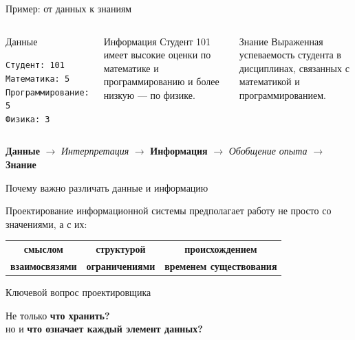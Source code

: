 \documentclass[aspectratio=169]{beamer}
\begin{document}
\begin{frame}{Пример: от данных к знаниям}

\begin{columns}[T]
\begin{block}{\centering Данные}
\begin{center}
\small
\texttt{Студент: 101}\\[0.1cm]
\texttt{Математика: 5}\\[0.1cm]
\texttt{Программирование: 5}\\[0.1cm]
\texttt{Физика: 3}
\end{center}
\end{block}

\begin{block}{\centering Информация}
\small
Студент 101 имеет высокие оценки по математике и программированию и более низкую — по физике.
\end{block}

\begin{block}{\centering Знание}
\small
Выраженная успеваемость студента в дисциплинах, связанных с математикой и программированием.
\end{block}
\end{columns}

\vspace{0.7cm}

\begin{center}
\large
\textbf{Данные}
\;$\longrightarrow$\;
\textit{Интерпретация}
\;$\longrightarrow$\;
\textbf{Информация}
\;$\longrightarrow$\;
\textit{Обобщение опыта}
\;$\longrightarrow$\;
\textbf{Знание}
\end{center}

\end{frame}


\begin{frame}{Почему важно различать данные и информацию}

Проектирование информационной системы предполагает  
работу не просто со значениями, а с их:

\vspace{0.4cm}

\begin{center}
\begin{tabular}{ccc}
\textbf{смыслом} & \textbf{структурой} & \textbf{происхождением} \\[0.3cm]
\textbf{взаимосвязями} & \textbf{ограничениями} & \textbf{временем существования}
\end{tabular}
\end{center}

\vspace{0.7cm}

\begin{alertblock}{Ключевой вопрос проектировщика}
\begin{center}
Не только \Large\textbf{что хранить?}\\[0.3cm]
но и \Large\textbf{что означает каждый элемент данных?}
\end{center}
\end{alertblock}

\end{frame}
\end{document}

